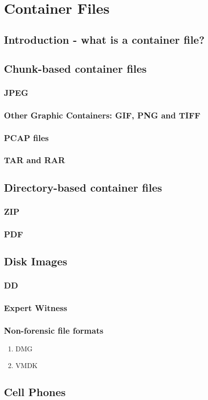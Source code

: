 \chapter{Container Files}\label{ch:container_files}
\section{Introduction - what is a container file?}
\section{Chunk-based container files}
\subsection{JPEG}
\subsection{Other Graphic Containers: GIF, PNG and TIFF}
\subsection{PCAP files}
\subsection{TAR and RAR}
\section{Directory-based container files}
\subsection{ZIP}
\subsection{PDF}
\section{Disk Images}
\subsection{DD}
\subsection{Expert Witness}
\subsection{Non-forensic file formats}
\begin{enumerate}
\item DMG
\item VMDK
\end{enumerate}
\section{Cell Phones}

